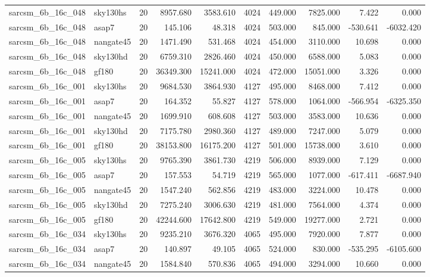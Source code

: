 \begin{longtable}{llrrrrrrrr}
sarcsm\_6b\_16c\_048 & sky130hs & 20 & 8957.680 & 3583.610 & 4024 & 449.000 & 7825.000 & 7.422 & 0.000 \\
sarcsm\_6b\_16c\_048 & asap7 & 20 & 145.106 & 48.318 & 4024 & 503.000 & 845.000 & -530.641 & -6032.420 \\
sarcsm\_6b\_16c\_048 & nangate45 & 20 & 1471.490 & 531.468 & 4024 & 454.000 & 3110.000 & 10.698 & 0.000 \\
sarcsm\_6b\_16c\_048 & sky130hd & 20 & 6759.310 & 2826.460 & 4024 & 450.000 & 6588.000 & 5.083 & 0.000 \\
sarcsm\_6b\_16c\_048 & gf180 & 20 & 36349.300 & 15241.000 & 4024 & 472.000 & 15051.000 & 3.326 & 0.000 \\
sarcsm\_6b\_16c\_001 & sky130hs & 20 & 9684.530 & 3864.930 & 4127 & 495.000 & 8468.000 & 7.412 & 0.000 \\
sarcsm\_6b\_16c\_001 & asap7 & 20 & 164.352 & 55.827 & 4127 & 578.000 & 1064.000 & -566.954 & -6325.350 \\
sarcsm\_6b\_16c\_001 & nangate45 & 20 & 1699.910 & 608.608 & 4127 & 503.000 & 3583.000 & 10.636 & 0.000 \\
sarcsm\_6b\_16c\_001 & sky130hd & 20 & 7175.780 & 2980.360 & 4127 & 489.000 & 7247.000 & 5.079 & 0.000 \\
sarcsm\_6b\_16c\_001 & gf180 & 20 & 38153.800 & 16175.200 & 4127 & 501.000 & 15738.000 & 3.610 & 0.000 \\
sarcsm\_6b\_16c\_005 & sky130hs & 20 & 9765.390 & 3861.730 & 4219 & 506.000 & 8939.000 & 7.129 & 0.000 \\
sarcsm\_6b\_16c\_005 & asap7 & 20 & 157.553 & 54.719 & 4219 & 565.000 & 1077.000 & -617.411 & -6687.940 \\
sarcsm\_6b\_16c\_005 & nangate45 & 20 & 1547.240 & 562.856 & 4219 & 483.000 & 3224.000 & 10.478 & 0.000 \\
sarcsm\_6b\_16c\_005 & sky130hd & 20 & 7275.240 & 3006.630 & 4219 & 481.000 & 7564.000 & 4.374 & 0.000 \\
sarcsm\_6b\_16c\_005 & gf180 & 20 & 42244.600 & 17642.800 & 4219 & 549.000 & 19277.000 & 2.721 & 0.000 \\
sarcsm\_6b\_16c\_034 & sky130hs & 20 & 9235.210 & 3676.320 & 4065 & 495.000 & 7920.000 & 7.877 & 0.000 \\
sarcsm\_6b\_16c\_034 & asap7 & 20 & 140.897 & 49.105 & 4065 & 524.000 & 830.000 & -535.295 & -6105.600 \\
sarcsm\_6b\_16c\_034 & nangate45 & 20 & 1584.840 & 570.836 & 4065 & 494.000 & 3294.000 & 10.660 & 0.000 \\

\end{longtable}
